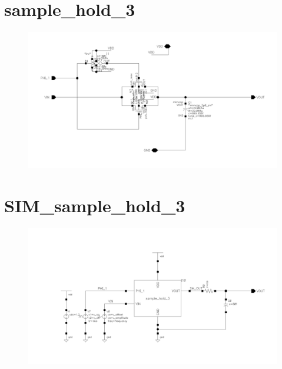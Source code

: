 \documentclass[english, 12pt, a4paper]{ifimaster}
\begin{document}
\begin{appendices}
\section{sample\_hold\_3}
\begin{figure}[!ht]
 \centering
 \includegraphics[width=20cm, angle=90]{img/sample_hold_schem_3}
 \label{app:sample:hold:3}
\end{figure}
\newpage
\section{SIM\_sample\_hold\_3}
\begin{figure}[!ht]
 \centering
 \includegraphics[width=20cm, angle=90]{img/SIM_sample_hold_3_schem}
 \label{app:SIM:sample:hold:3}
\end{figure}

\newpage

\end{appendices}
\end{document}
